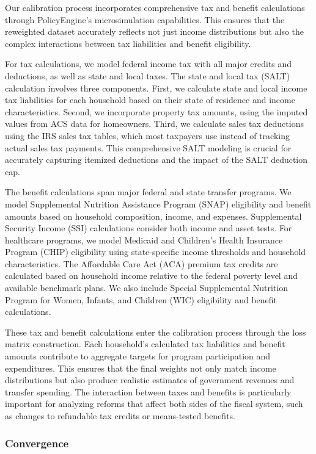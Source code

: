Our calibration process incorporates comprehensive tax and benefit calculations through PolicyEngine's microsimulation capabilities. This ensures that the reweighted dataset accurately reflects not just income distributions but also the complex interactions between tax liabilities and benefit eligibility.

For tax calculations, we model federal income tax with all major credits and deductions, as well as state and local taxes. The state and local tax (SALT) calculation involves three components. First, we calculate state and local income tax liabilities for each household based on their state of residence and income characteristics. Second, we incorporate property tax amounts, using the imputed values from ACS data for homeowners. Third, we calculate sales tax deductions using the IRS sales tax tables, which most taxpayers use instead of tracking actual sales tax payments. This comprehensive SALT modeling is crucial for accurately capturing itemized deductions and the impact of the SALT deduction cap.

The benefit calculations span major federal and state transfer programs. We model Supplemental Nutrition Assistance Program (SNAP) eligibility and benefit amounts based on household composition, income, and expenses. Supplemental Security Income (SSI) calculations consider both income and asset tests. For healthcare programs, we model Medicaid and Children's Health Insurance Program (CHIP) eligibility using state-specific income thresholds and household characteristics. The Affordable Care Act (ACA) premium tax credits are calculated based on household income relative to the federal poverty level and available benchmark plans. We also include Special Supplemental Nutrition Program for Women, Infants, and Children (WIC) eligibility and benefit calculations.

These tax and benefit calculations enter the calibration process through the loss matrix construction. Each household's calculated tax liabilities and benefit amounts contribute to aggregate targets for program participation and expenditures. This ensures that the final weights not only match income distributions but also produce realistic estimates of government revenues and transfer spending. The interaction between taxes and benefits is particularly important for analyzing reforms that affect both sides of the fiscal system, such as changes to refundable tax credits or means-tested benefits.

\subsubsection{Convergence}

